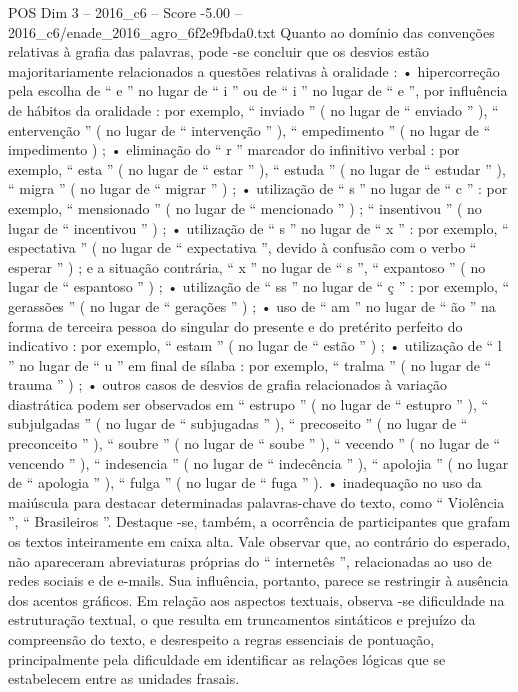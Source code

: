 \begin{textsample}{POS Dim 3 – 2016\_c6 – Score -5.00 – 2016\_c6/enade\_2016\_agro\_6f2e9fbda0.txt}
Quanto ao domínio das convenções relativas à grafia das palavras, pode -se concluir que os desvios estão majoritariamente relacionados a questões relativas à oralidade : • hipercorreção pela escolha de “ e ” no lugar de “ i ” ou de “ i ” no lugar de “ e ”, por influência de hábitos da oralidade : por exemplo, “ inviado ” ( no lugar de “ enviado ” ), “ entervenção ” ( no lugar de “ intervenção ” ), “ empedimento ” ( no lugar de “ impedimento ) ; • eliminação do “ r ” marcador do infinitivo verbal : por exemplo, “ esta ” ( no lugar de “ estar ” ), “ estuda ” ( no lugar de “ estudar ” ), “ migra ” ( no lugar de “ migrar ” ) ; • utilização de “ s ” no lugar de “ c ” : por exemplo, “ mensionado ” ( no lugar de “ mencionado ” ) ; “ insentivou ” ( no lugar de “ incentivou ” ) ; • utilização de “ s ” no lugar de “ x ” : por exemplo, “ espectativa ” ( no lugar de “ expectativa ”, devido à confusão com o verbo “ esperar ” ) ; e a situação contrária, “ x ” no lugar de “ s ”, “ expantoso ” ( no lugar de “ espantoso ” ) ; • utilização de “ ss ” no lugar de “ ç ” : por exemplo, “ gerassões ” ( no lugar de “ gerações ” ) ; • uso de “ am ” no lugar de “ ão ” na forma de terceira pessoa do singular do presente e do pretérito perfeito do indicativo : por exemplo, “ estam ” ( no lugar de “ estão ” ) ; • utilização de “ l ” no lugar de “ u ” em final de sílaba : por exemplo, “ tralma ” ( no lugar de “ trauma ” ) ; • outros casos de desvios de grafia relacionados à variação diastrática podem ser observados em “ estrupo ” ( no lugar de “ estupro ” ), “ subjulgadas ” ( no lugar de “ subjugadas ” ), “ precoseito ” ( no lugar de “ preconceito ” ), “ soubre ” ( no lugar de “ soube ” ), “ vecendo ” ( no lugar de “ vencendo ” ), “ indesencia ” ( no lugar de “ indecência ” ), “ apolojia ” ( no lugar de “ apologia ” ), “ fulga ” ( no lugar de “ fuga ” ). • inadequação no uso da maiúscula para destacar determinadas palavras-chave do texto, como “ Violência ”, “ Brasileiros ”.
Destaque -se, também, a ocorrência de participantes que grafam os textos inteiramente em caixa alta.
Vale observar que, ao contrário do esperado, não apareceram abreviaturas próprias do “ internetês ”, relacionadas ao uso de redes sociais e de e-mails.
Sua influência, portanto, parece se restringir à ausência dos acentos gráficos.
Em relação aos aspectos textuais, observa -se dificuldade na estruturação textual, o que resulta em truncamentos sintáticos e prejuízo da compreensão do texto, e desrespeito a regras essenciais de pontuação, principalmente pela dificuldade em identificar as relações lógicas que se estabelecem entre as unidades frasais.

\end{textsample}
